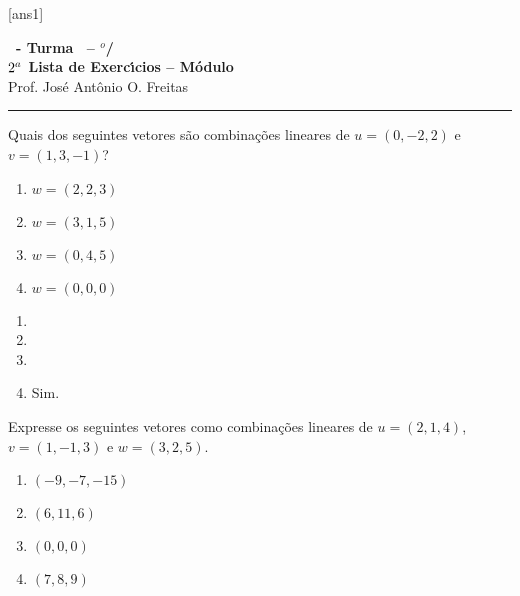 \documentclass[12pt]{exam}
\begin{document}
  [ans1]
  \begin{center}
    {\Large\bf \disciplina\ - Turma \turma\ -- \semestre$^{o}$/\ano} \\ \vspace{9pt} {\large\bf
        $2^a$ Lista de Exerc{\'\i}cios -- Módulo \numeromodulo}\\ \vspace{9pt} Prof. Jos{\'e} Ant{\^o}nio O. Freitas
  \end{center}
  \hrule


\begin{exercicio}
    Quais dos seguintes vetores são combinações lineares de $u = (0, -2, 2)$ e $v = (1, 3, -1)$?
    \begin{multicols}{2}
        \begin{enumerate}[label={\alph*})]
            \item $w = (2, 2, 3)$

            \item $w = (3, 1, 5)$

            \item $w = (0, 4, 5)$

            \item $w = (0, 0, 0)$
        \end{enumerate}
    \end{multicols}

    \begin{solution}
        \begin{enumerate}[label={\alph*})]
            \item

            \item

            \item

            \item Sim.
        \end{enumerate}
    \end{solution}
\end{exercicio}

\begin{exercicio}
    Expresse os seguintes vetores como combinações lineares de $u = (2, 1, 4)$, $v = (1, -1, 3)$ e $w = (3, 2, 5)$.
    \begin{multicols}{2}
        \begin{enumerate}[label={\alph*})]
            \item $(-9, -7, -15)$

            \item $(6, 11, 6)$

            \item $(0, 0, 0)$

            \item $(7, 8, 9)$
        \end{enumerate}
    \end{multicols}
\end{exercicio}
\end{document}
